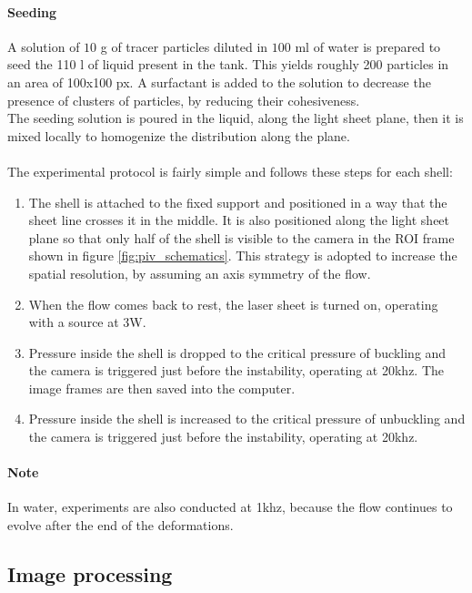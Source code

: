 \paragraph{Seeding}
A solution of $10$ g of tracer particles diluted in $100$ ml of water is prepared to seed the 110 l of liquid present in the tank. This yields roughly 200 particles in an area of 100x100 px. A surfactant is added to the solution to decrease the presence of clusters of particles, by reducing their cohesiveness.\\
The seeding solution is poured in the liquid, along the light sheet plane, then it is mixed locally to homogenize the distribution along the plane.\\ 
\paragraph{}
The experimental protocol is fairly simple and follows these steps for each shell:
\begin{enumerate}
	\item The shell is attached to the fixed support and positioned in a way that the sheet line crosses it in the middle. It is also positioned along the light sheet plane so that only half of the shell is visible to the camera in the ROI frame shown in figure \ref{fig:piv_schematics}. This strategy is adopted to increase the spatial resolution, by assuming an axis symmetry of the flow.
	\item When the flow comes back to rest, the laser sheet is turned on, operating with a source at 3W.
	\item Pressure inside the shell is dropped to the critical pressure of buckling and the camera is triggered just before the instability, operating at 20khz. The image frames are then saved into the computer.
	\item Pressure inside the shell is increased to the critical pressure of unbuckling and the camera is triggered just before the instability, operating at 20khz.
\end{enumerate}
 \paragraph{Note}
In water, experiments are also conducted at 1khz, because the flow continues to evolve after the end of the deformations.


\subsection{Image processing}

